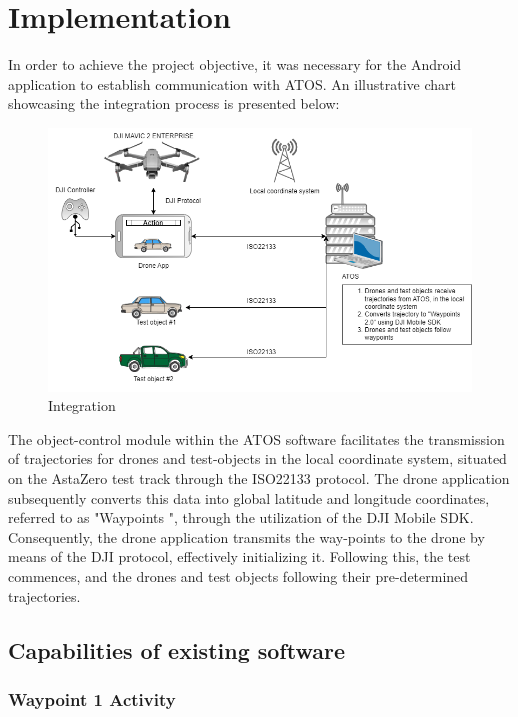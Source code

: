 \chapter{Implementation}
In order to achieve the project objective, it was necessary for the Android application to establish communication with ATOS. An illustrative chart showcasing the integration process is presented below:

\begin{figure}[H]
  \centering
  \includegraphics[width=\columnwidth]{figure/flow_config.png}
  \caption{Integration}
  \label{fig:ATOS-APP}
\end{figure}
The object-control module within the ATOS software facilitates the transmission of trajectories for drones and test-objects in the local coordinate system, situated on the AstaZero test track through the ISO22133 protocol. The drone application subsequently converts this data into global latitude and longitude coordinates, referred to as "Waypoints ", through the utilization of the DJI Mobile SDK. Consequently, the drone application transmits the way-points to the drone by means of the DJI protocol, effectively initializing it. Following this, the test commences, and the drones and test objects following their pre-determined trajectories.

\section{Capabilities of existing software}

\subsection{Waypoint 1 Activity}
